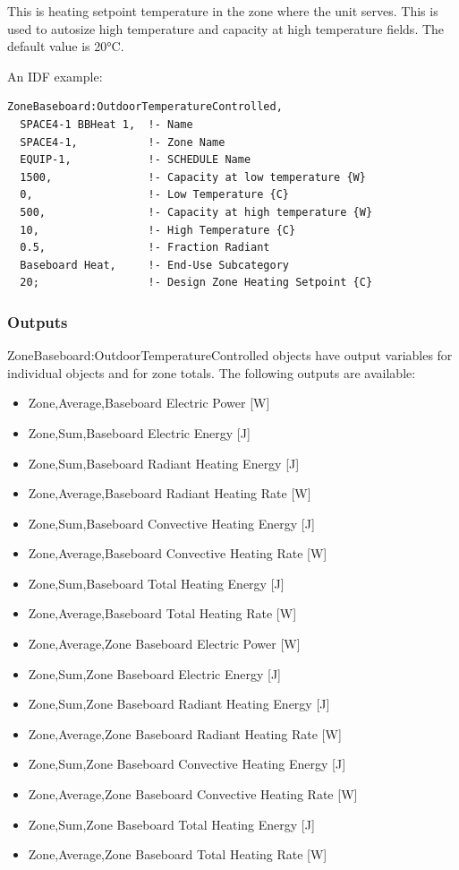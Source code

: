 This is heating setpoint temperature in the zone where the unit serves. This is used to autosize high temperature and capacity at high temperature fields. The default value is 20°C.

An IDF example:

\begin{lstlisting}
ZoneBaseboard:OutdoorTemperatureControlled,
  SPACE4-1 BBHeat 1,  !- Name
  SPACE4-1,           !- Zone Name
  EQUIP-1,            !- SCHEDULE Name
  1500,               !- Capacity at low temperature {W}
  0,                  !- Low Temperature {C}
  500,                !- Capacity at high temperature {W}
  10,                 !- High Temperature {C}
  0.5,                !- Fraction Radiant
  Baseboard Heat,     !- End-Use Subcategory
  20;                 !- Design Zone Heating Setpoint {C}
\end{lstlisting}

\subsubsection{Outputs}\label{outputs-14-002}

ZoneBaseboard:OutdoorTemperatureControlled objects have output variables for individual objects and for zone totals. The following outputs are available:

\begin{itemize}
\tightlist
\item
  Zone,Average,Baseboard Electric Power {[}W{]}
\item
  Zone,Sum,Baseboard Electric Energy {[}J{]}
\item
  Zone,Sum,Baseboard Radiant Heating Energy {[}J{]}
\item
  Zone,Average,Baseboard Radiant Heating Rate {[}W{]}
\item
  Zone,Sum,Baseboard Convective Heating Energy {[}J{]}
\item
  Zone,Average,Baseboard Convective Heating Rate {[}W{]}
\item
  Zone,Sum,Baseboard Total Heating Energy {[}J{]}
\item
  Zone,Average,Baseboard Total Heating Rate {[}W{]}
\item
  Zone,Average,Zone Baseboard Electric Power {[}W{]}
\item
  Zone,Sum,Zone Baseboard Electric Energy {[}J{]}
\item
  Zone,Sum,Zone Baseboard Radiant Heating Energy {[}J{]}
\item
  Zone,Average,Zone Baseboard Radiant Heating Rate {[}W{]}
\item
  Zone,Sum,Zone Baseboard Convective Heating Energy {[}J{]}
\item
  Zone,Average,Zone Baseboard Convective Heating Rate {[}W{]}
\item
  Zone,Sum,Zone Baseboard Total Heating Energy {[}J{]}
\item
  Zone,Average,Zone Baseboard Total Heating Rate {[}W{]}
\end{itemize}

